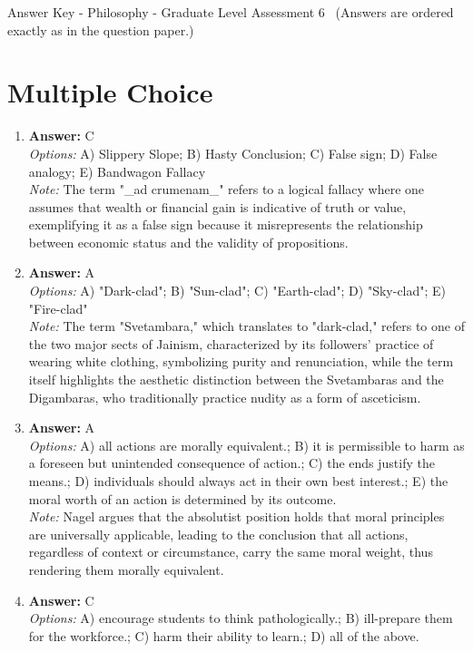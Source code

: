 \documentclass[12pt]{article}
\begin{document}
\begin{center}
Answer Key - Philosophy - Graduate Level Assessment 6 \
\small (Answers are ordered exactly as in the question paper.)
\end{center}

\section*{Multiple Choice}
\begin{enumerate}[label=\arabic*.]
\item \textbf{Answer:} C
\\ \textit{Options:} A) Slippery Slope; B) Hasty Conclusion; C) False sign; D) False analogy; E) Bandwagon Fallacy
\\ \textit{Note:} The term "\_ad crumenam\_" refers to a logical fallacy where one assumes that wealth or financial gain is indicative of truth or value, exemplifying it as a false sign because it misrepresents the relationship between economic status and the validity of propositions.
\item \textbf{Answer:} A
\\ \textit{Options:} A) "Dark-clad"; B) "Sun-clad"; C) "Earth-clad"; D) "Sky-clad"; E) "Fire-clad"
\\ \textit{Note:} The term "Svetambara," which translates to "dark-clad," refers to one of the two major sects of Jainism, characterized by its followers' practice of wearing white clothing, symbolizing purity and renunciation, while the term itself highlights the aesthetic distinction between the Svetambaras and the Digambaras, who traditionally practice nudity as a form of asceticism.
\item \textbf{Answer:} A
\\ \textit{Options:} A) all actions are morally equivalent.; B) it is permissible to harm as a foreseen but unintended consequence of action.; C) the ends justify the means.; D) individuals should always act in their own best interest.; E) the moral worth of an action is determined by its outcome.
\\ \textit{Note:} Nagel argues that the absolutist position holds that moral principles are universally applicable, leading to the conclusion that all actions, regardless of context or circumstance, carry the same moral weight, thus rendering them morally equivalent.
\item \textbf{Answer:} C
\\ \textit{Options:} A) encourage students to think pathologically.; B) ill-prepare them for the workforce.; C) harm their ability to learn.; D) all of the above.

\end{enumerate}
\end{document}
